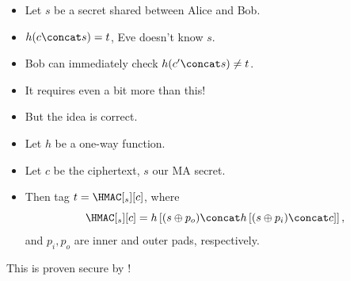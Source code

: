 \begin{frame}
  \begin{solution}
    \begin{itemize}
      \item Let \(s\) be a secret shared between Alice and Bob.

        \pause{}

      \item \(h(c\concat s) = t\), Eve doesn't know \(s\).
      \item Bob can immediately check \(h(c^\prime\concat s)\neq t\).
    \end{itemize}
  \end{solution}

  \pause{}

  \begin{remark}
    \begin{itemize}
      \item It requires even a bit more than this!
      \item But the idea is correct.
    \end{itemize}
  \end{remark}
\end{frame}

\begin{frame}
  \begin{solution}
    \begin{itemize}
      \item Let \(h\) be a one-way function.
      \item Let \(c\) be the ciphertext, \(s\) our \ac{MA} secret.

        \pause{}

      \item Then tag \(t = \HMAC[_s][c]\), where \[
          \HMAC[_s][c] = h\left[
            (s\oplus p_o)\concat h\left[ (s\oplus p_i)\concat c \right]
          \right],
        \] and \(p_i, p_o\) are inner and outer pads, respectively.
    \end{itemize}
  \end{solution}

  \pause{}

  \begin{remark}
    This is proven secure by \textcite{HMAC}!
  \end{remark}
\end{frame}

